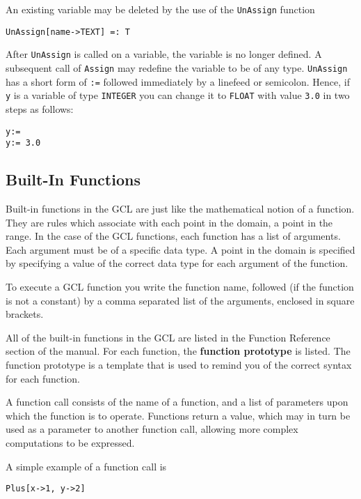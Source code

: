 An existing variable may be deleted by the use of the {\tt UnAssign}
function

\begin{verbatim}
UnAssign[name->TEXT] =: T
\end{verbatim}

\noindent After \verb+UnAssign+ is called on a variable, the variable
is no longer defined.  A subsequent call of {\tt Assign} may redefine
the variable to be of any type.  \verb+UnAssign+ has a short form of
\verb+:=+ followed immediately by a linefeed or semicolon.  Hence, if
\verb+y+ is a variable of type \verb+INTEGER+ you can change it to
\verb+FLOAT+ with value \verb+3.0+ in two steps as follows:

\begin{verbatim}
y:=
y:= 3.0
\end{verbatim}  

\subsection{Built-In Functions}

Built-in functions in the GCL are just like the mathematical notion of
a function.  They are rules which associate with each point in the  
domain, a point in the range.  In the case of the GCL functions, each
function has a list of arguments.  Each argument must be of a specific
data type.  A point in the domain is specified by specifying a value
of the correct data type for each argument of the function.  

To execute a GCL function you write the function name, followed
(if the function is not a constant) by a comma separated list of the
arguments, enclosed in square brackets.  

All of the built-in functions in the GCL are listed in the Function
Reference section of the manual.  For each function, the {\bf function
prototype} is listed.  The function prototype is a template that is
used to remind you of the correct syntax for each function.  

A function call consists of the name of a function, and a list of
parameters upon which the function is to operate.  Functions return a
value, which may in turn be used as a parameter to another function
call, allowing more complex computations to be expressed.

A simple example of a function call is

\begin{verbatim}
Plus[x->1, y->2]
\end{verbatim}

